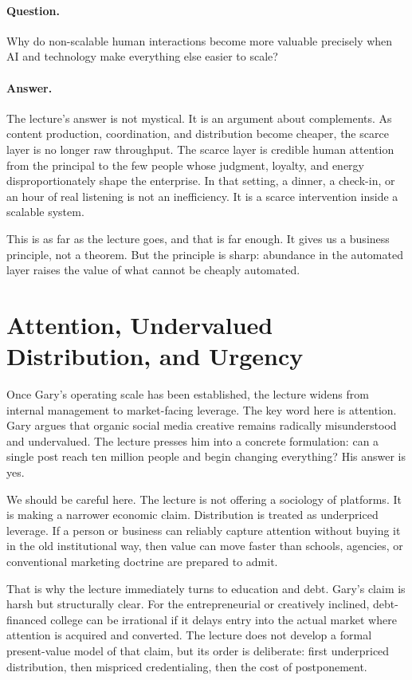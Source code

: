 \paragraph{Question.} Why do non-scalable human interactions become more valuable precisely when AI and technology make everything else easier to scale?

\paragraph{Answer.} The lecture's answer is not mystical. It is an argument about complements. As content production, coordination, and distribution become cheaper, the scarce layer is no longer raw throughput. The scarce layer is credible human attention from the principal to the few people whose judgment, loyalty, and energy disproportionately shape the enterprise. In that setting, a dinner, a check-in, or an hour of real listening is not an inefficiency. It is a scarce intervention inside a scalable system.

This is as far as the lecture goes, and that is far enough. It gives us a business principle, not a theorem. But the principle is sharp: abundance in the automated layer raises the value of what cannot be cheaply automated.

\section{Attention, Undervalued Distribution, and Urgency}

Once Gary's operating scale has been established, the lecture widens from internal management to market-facing leverage. The key word here is attention. Gary argues that organic social media creative remains radically misunderstood and undervalued. The lecture presses him into a concrete formulation: can a single post reach ten million people and begin changing everything? His answer is yes.

We should be careful here. The lecture is not offering a sociology of platforms. It is making a narrower economic claim. Distribution is treated as underpriced leverage. If a person or business can reliably capture attention without buying it in the old institutional way, then value can move faster than schools, agencies, or conventional marketing doctrine are prepared to admit.

That is why the lecture immediately turns to education and debt. Gary's claim is harsh but structurally clear. For the entrepreneurial or creatively inclined, debt-financed college can be irrational if it delays entry into the actual market where attention is acquired and converted. The lecture does not develop a formal present-value model of that claim, but its order is deliberate: first underpriced distribution, then mispriced credentialing, then the cost of postponement.

